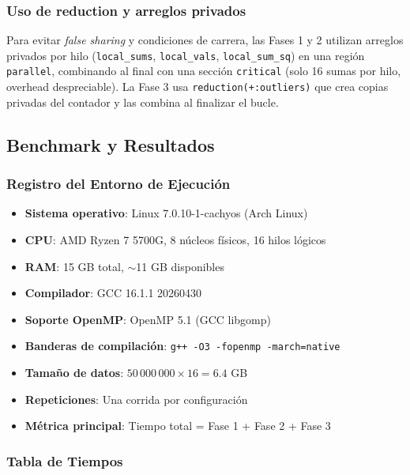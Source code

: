 \documentclass[10pt,a4paper]{article}
\begin{document}
\subsubsection{Uso de reduction y arreglos privados}

Para evitar \emph{false sharing} y condiciones de carrera, las Fases 1 y 2
utilizan arreglos privados por hilo (\texttt{local\_sums}, \texttt{local\_vals},
\texttt{local\_sum\_sq}) en una regi\'on \texttt{parallel}, combinando al final
con una secci\'on \texttt{critical} (solo 16 sumas por hilo, overhead
despreciable). La Fase 3 usa \texttt{reduction(+:outliers)} que crea copias
privadas del contador y las combina al finalizar el bucle.

\subsection{Benchmark y Resultados}

\subsubsection{Registro del Entorno de Ejecuci\'on}

\begin{itemize}
    \item \textbf{Sistema operativo}: Linux 7.0.10-1-cachyos (Arch Linux)
    \item \textbf{CPU}: AMD Ryzen 7 5700G, 8 n\'ucleos f\'isicos, 16 hilos l\'ogicos
    \item \textbf{RAM}: 15 GB total, $\sim$11 GB disponibles
    \item \textbf{Compilador}: GCC 16.1.1 20260430
    \item \textbf{Soporte OpenMP}: OpenMP 5.1 (GCC libgomp)
    \item \textbf{Banderas de compilaci\'on}: \texttt{g++ -O3 -fopenmp -march=native}
    \item \textbf{Tama\~no de datos}: $50\,000\,000 \times 16 = 6.4$ GB
    \item \textbf{Repeticiones}: Una corrida por configuraci\'on
    \item \textbf{M\'etrica principal}: Tiempo total = Fase 1 + Fase 2 + Fase 3
\end{itemize}

\subsubsection{Tabla de Tiempos}
\end{document}
